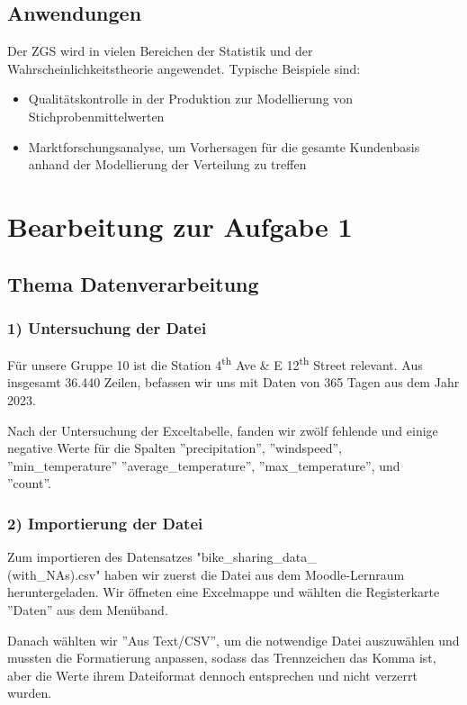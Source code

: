 \documentclass[11pt]{article}
\begin{document}
\subsection{Anwendungen}
Der ZGS wird in vielen Bereichen der Statistik und der Wahrscheinlichkeitstheorie angewendet. Typische Beispiele sind:
\begin{itemize}
    \item Qualitätskontrolle in der Produktion zur Modellierung von Stichprobenmittelwerten
    \item Marktforschungsanalyse, um Vorhersagen für die gesamte Kundenbasis anhand der Modellierung der Verteilung zu treffen
\end{itemize}
\newpage

\section{Bearbeitung zur Aufgabe 1}

\subsection{Thema Datenverarbeitung}

\subsubsection{1) Untersuchung der Datei}
Für unsere Gruppe 10 ist die Station 4\textsuperscript{th} Ave \& E 12\textsuperscript{th} Street relevant. Aus insgesamt 36.440 Zeilen, befassen wir uns mit Daten von 365 Tagen aus dem Jahr 2023.

Nach der Untersuchung der Exceltabelle, fanden wir zwölf fehlende und einige negative Werte für die Spalten ''precipitation'', ''windspeed'', \\ ''min\_temperature'' ''average\_temperature'', ''max\_temperature'', und \\ ''count''.

\subsubsection{2) Importierung der Datei}
Zum importieren des Datensatzes "bike\_sharing\_data\_ \\(with\_NAs).csv" haben wir zuerst die Datei aus dem Moodle-Lernraum heruntergeladen. Wir öffneten eine Excelmappe und wählten die Registerkarte ''Daten'' aus dem Menüband.

Danach wählten wir ''Aus Text/CSV'', um die notwendige Datei auszuwählen und mussten die Formatierung anpassen, sodass das Trennzeichen das Komma ist, aber die Werte ihrem Dateiformat dennoch entsprechen und nicht verzerrt wurden.
\end{document}
